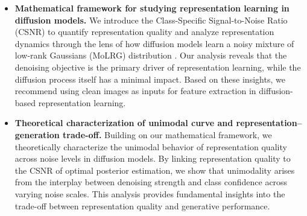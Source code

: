 \begin{itemize}[leftmargin=*]
    \item \textbf{Mathematical framework for studying representation learning in diffusion models.} We introduce the Class-Specific Signal-to-Noise Ratio (CSNR) to quantify representation quality and analyze representation dynamics through the lens of how diffusion models learn a noisy mixture of low-rank Gaussians (MoLRG) distribution \citep{wang2024diffusion}. Our analysis reveals that the denoising objective is the primary driver of representation learning, while the diffusion process itself has a minimal impact. Based on these insights, we recommend using clean images as inputs for feature extraction in diffusion-based representation learning.
    
    
    \item \textbf{Theoretical characterization of unimodal curve and representation–generation trade-off.} Building on our mathematical framework, we theoretically characterize the unimodal behavior of representation quality across noise levels in diffusion models. By linking representation quality to the CSNR of optimal posterior estimation, we show that unimodality arises from the interplay between denoising strength and class confidence across varying noise scales. This analysis provides fundamental insights into the trade-off between representation quality and generative performance. 
    

\end{itemize}
